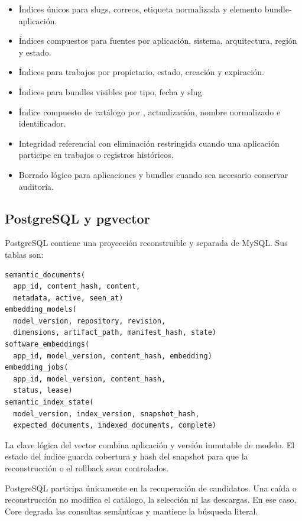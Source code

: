 \begin{itemize}
	\item Índices únicos para slugs, correos, etiqueta normalizada y elemento bundle-aplicación.
	\item Índices compuestos para fuentes por aplicación, sistema, arquitectura, región y estado.
	\item Índices para trabajos por propietario, estado, creación y expiración.
	\item Índices para bundles visibles por tipo, fecha y slug.
	\item Índice compuesto de catálogo por , actualización, nombre normalizado e identificador.
	\item Integridad referencial con eliminación restringida cuando una aplicación participe en trabajos o registros históricos.
	\item Borrado lógico para aplicaciones y bundles cuando sea necesario conservar auditoría.
\end{itemize}

\subsection{PostgreSQL y pgvector}

PostgreSQL contiene una proyección reconstruible y separada de MySQL. Sus tablas son:

{\small
\begin{verbatim}
semantic_documents(
  app_id, content_hash, content,
  metadata, active, seen_at)
embedding_models(
  model_version, repository, revision,
  dimensions, artifact_path, manifest_hash, state)
software_embeddings(
  app_id, model_version, content_hash, embedding)
embedding_jobs(
  app_id, model_version, content_hash,
  status, lease)
semantic_index_state(
  model_version, index_version, snapshot_hash,
  expected_documents, indexed_documents, complete)
\end{verbatim}
}

La clave lógica del vector combina aplicación y versión inmutable de modelo. El estado del índice guarda cobertura y hash del snapshot para que la reconstrucción o el rollback sean controlados.

PostgreSQL participa únicamente en la recuperación de candidatos. Una caída o reconstrucción no modifica el catálogo, la selección ni las descargas. En ese caso, Core degrada las consultas semánticas y mantiene la búsqueda literal.


